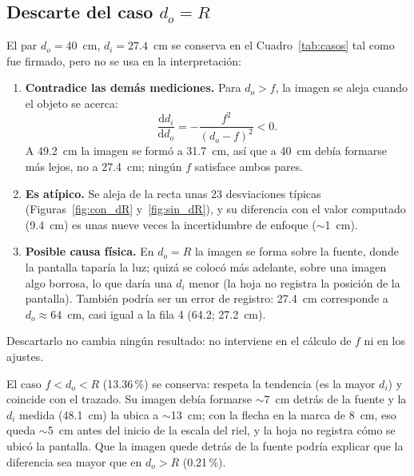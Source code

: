 \documentclass[11pt,a4paper]{article}
\begin{document}
\subsection{Descarte del caso $d_o = R$}
\label{sec:descarte}
El par $d_o = 40$~cm, $d_i = 27.4$~cm se conserva en el Cuadro~\ref{tab:casos} tal como fue firmado, pero no se usa en la interpretación:
\begin{enumerate}
  \item \textbf{Contradice las demás mediciones.} Para $d_o > f$, la imagen se aleja cuando el objeto se acerca:
  \[
    \frac{\mathrm{d}d_i}{\mathrm{d}d_o} = -\frac{f^2}{(d_o - f)^2} < 0 .
  \]
  A 49.2~cm la imagen se formó a 31.7~cm, así que a 40~cm debía formarse más lejos, no a 27.4~cm; ningún $f$ satisface ambos pares.
  \item \textbf{Es atípico.} Se aleja de la recta unas 23 desviaciones típicas (Figuras~\ref{fig:con_dR} y~\ref{fig:sin_dR}), y su diferencia con el valor computado (9.4~cm) es unas nueve veces la incertidumbre de enfoque ($\sim$1~cm).
  \item \textbf{Posible causa física.} En $d_o = R$ la imagen se forma sobre la fuente, donde la pantalla taparía la luz; quizá se colocó más adelante, sobre una imagen algo borrosa, lo que daría una $d_i$ menor (la hoja no registra la posición de la pantalla). También podría ser un error de registro: 27.4~cm corresponde a $d_o \approx 64$~cm, casi igual a la fila 4 (64.2; 27.2~cm).
\end{enumerate}
Descartarlo no cambia ningún resultado: no interviene en el cálculo de $f$ ni en los ajustes.

El caso $f < d_o < R$ (13.36\,\%) se conserva: respeta la tendencia (es la mayor $d_i$) y coincide con el trazado. Su imagen debía formarse $\sim$7~cm detrás de la fuente y la $d_i$ medida (48.1~cm) la ubica a $\sim$13~cm; con la flecha en la marca de 8~cm, eso queda $\sim$5~cm antes del inicio de la escala del riel, y la hoja no registra cómo se ubicó la pantalla. Que la imagen quede detrás de la fuente podría explicar que la diferencia sea mayor que en $d_o > R$ (0.21\,\%).
\end{document}
